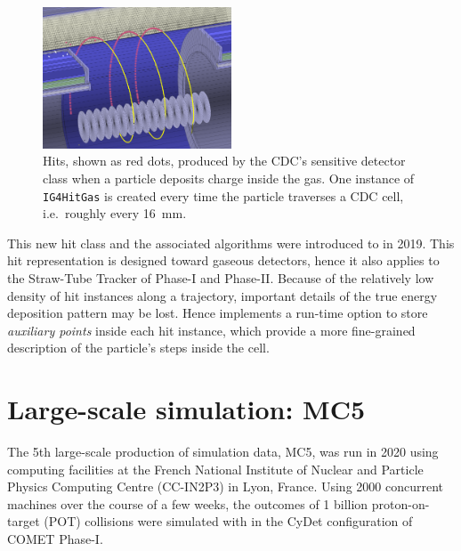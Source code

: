 \begin{figure}
    \centering
    \includegraphics[width=0.5\textwidth]{chapter3/hit_instances_blur_crop.png}
    \caption{Hits, shown as red dots, produced by the CDC's sensitive detector class when a particle deposits charge inside the gas. One instance of \texttt{IG4HitGas} is created every time the particle traverses a CDC cell, i.e.\ roughly every \SI{16}{mm}.}
    \label{fig:sim_cdc_hits}
\end{figure}


This new hit class and the associated algorithms were introduced to \SimG in 2019. This hit representation is designed toward gaseous detectors, hence it also applies to the Straw-Tube Tracker of Phase-I and Phase-II. 
Because of the relatively low density of hit instances along a trajectory, important details of the true energy deposition pattern may be lost. Hence \SimG implements a run-time option to store \emph{auxiliary points} inside each hit instance, which provide a more fine-grained description of the particle's steps inside the cell.




\section{Large-scale simulation: MC5}\label{sec:mc5}
The 5th large-scale production of simulation data, MC5, was run in 2020 using computing facilities at the French National Institute of Nuclear and Particle Physics Computing Centre (CC-IN2P3) in Lyon, France.
Using \num{2000} concurrent machines over the course of a few weeks, the outcomes of 1 billion proton-on-target (POT) collisions were simulated with \SimG in the CyDet configuration of COMET Phase-I.

